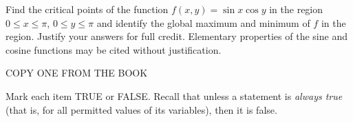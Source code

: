 \documentclass[12pt]{exam}
\begin{document}
\begin{questions}

\newpage

\question[12] Find the critical points of the function $f(x,y) = \sin x \cos y$ in the region $0 \leq x \leq \pi$, $0 \leq y \leq \pi$ and identify the global maximum and minimum of $f$ in the region. Justify your answers for full credit. Elementary properties of the sine and cosine functions may be cited without justification.


\question[12] COPY ONE FROM THE BOOK


\newpage

\question Mark each item TRUE or FALSE. Recall that unless a statement is \emph{always true} (that is, for all permitted values of its variables), then it is false.


\end{questions}
\end{document}
